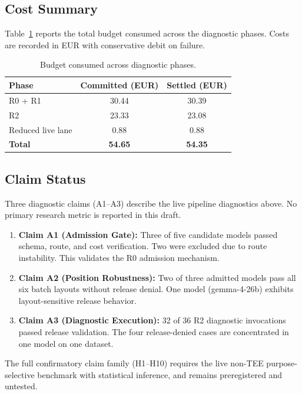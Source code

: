 \subsection{Cost Summary}

Table~\ref{tab:cost_summary} reports the total budget consumed across the
diagnostic phases. Costs are recorded in EUR with conservative debit on
failure.

\begin{table}[t]
\centering
\caption{Budget consumed across diagnostic phases.}
\label{tab:cost_summary}
\small
\begin{tabular}{lcc}
\toprule
Phase & Committed (EUR) & Settled (EUR) \\
\midrule
R0 + R1 & 30.44 & 30.39 \\
R2 & 23.33 & 23.08 \\
Reduced live lane & 0.88 & 0.88 \\
\midrule
\textbf{Total} & \textbf{54.65} & \textbf{54.35} \\
\bottomrule
\end{tabular}
\end{table}

\subsection{Claim Status}

Three diagnostic claims (A1--A3) describe the live pipeline diagnostics
above. No primary research metric is reported in this draft.

\begin{enumerate}
\item \textbf{Claim A1 (Admission Gate):} Three of five candidate models
      passed schema, route, and cost verification. Two were excluded due to
      route instability. This validates the R0 admission mechanism.
\item \textbf{Claim A2 (Position Robustness):} Two of three admitted models
      pass all six batch layouts without release denial. One model
      (gemma-4-26b) exhibits layout-sensitive release behavior.
\item \textbf{Claim A3 (Diagnostic Execution):} 32 of 36 R2 diagnostic
      invocations passed release validation. The four release-denied cases
      are concentrated in one model on one dataset.
\end{enumerate}

The full confirmatory claim family (H1--H10) requires the live non-TEE
purpose-selective benchmark with statistical inference, and remains
preregistered and untested.

